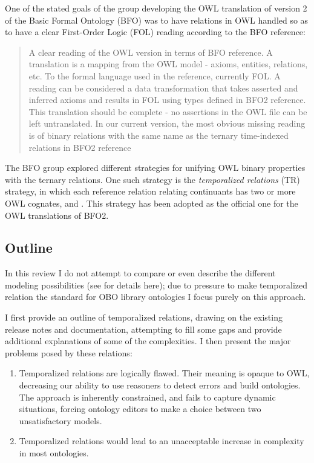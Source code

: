 \documentclass{bioinfo}
\begin{document}
One of the stated goals of the group developing the OWL translation of
version 2 of the Basic Formal Ontology (BFO)\cite{Grenon2004} was to
have relations in OWL handled so as to have a clear First-Order Logic
(FOL) reading according to the BFO reference\cite{BFO2Ref}:

\begin{quotation}
  A clear reading of the OWL version in terms of BFO reference. A
  translation is a mapping from the OWL model - axioms, entities,
  relations, etc. To the formal language used in the reference,
  currently FOL. A reading can be considered a data transformation
  that takes asserted and inferred axioms and results in FOL using
  types defined in BFO2 reference. This translation should be complete
  - no assertions in the OWL file can be left untranslated. In our
  current version, the most obvious missing reading is of binary
  relations with the same name as the ternary time-indexed relations
  in BFO2 reference
\end{quotation}


The BFO
group explored different strategies for unifying OWL binary properties
with the ternary relations\cite{Grewe}.  One such strategy is the
\emph{temporalized relations} (TR) strategy, in which each reference
relation relating continuants has two or more OWL cognates,
 and . This strategy has
been adopted as the official one for the OWL translations of
BFO2\cite{Graz}.

\subsection{Outline}

In this review I do not attempt to compare or even describe the
different modeling possibilities (see \cite{Grewe} for details here);
due to pressure to make temporalized relation the standard for OBO
library ontologies I focus purely on this approach.

I first provide an outline of temporalized relations, drawing on the
existing release notes and documentation, attempting to fill some gaps
and provide additional explanations of some of the complexities. I
then present the major problems posed by these relations:

\begin{enumerate}

\item Temporalized relations are logically flawed. Their meaning is
  opaque to OWL, decreasing our ability to use reasoners to detect
  errors and build ontologies. The approach is inherently constrained,
  and fails to capture dynamic situations, forcing ontology editors to
  make a choice between two unsatisfactory models. 

\item Temporalized relations would lead to an unacceptable increase in
  complexity in most ontologies.

\end{enumerate}
\end{document}
